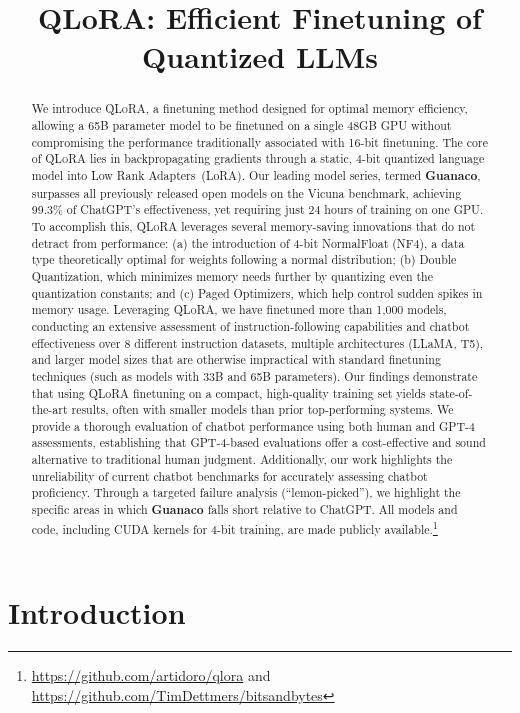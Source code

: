 \title{QLoRA: Efficient Finetuning of Quantized LLMs}

\begin{abstract}
We introduce \textsc{QLoRA}, a finetuning method designed for optimal memory efficiency, allowing a 65B parameter model to be finetuned on a single 48GB GPU without compromising the performance traditionally associated with 16-bit finetuning. The core of \textsc{QLoRA} lies in backpropagating gradients through a static, 4-bit quantized language model into Low Rank Adapters~(LoRA). Our leading model series, termed \textbf{Guanaco}, surpasses all previously released open models on the Vicuna benchmark, achieving 99.3\% of ChatGPT's effectiveness, yet requiring just 24 hours of training on one GPU. To accomplish this, \textsc{QLoRA} leverages several memory-saving innovations that do not detract from performance: (a) the introduction of 4-bit NormalFloat (NF4), a data type theoretically optimal for weights following a normal distribution; (b) Double Quantization, which minimizes memory needs further by quantizing even the quantization constants; and (c) Paged Optimizers, which help control sudden spikes in memory usage. Leveraging \textsc{QLoRA}, we have finetuned more than 1,000 models, conducting an extensive assessment of instruction-following capabilities and chatbot effectiveness over 8 different instruction datasets, multiple architectures (LLaMA, T5), and larger model sizes that are otherwise impractical with standard finetuning techniques (such as models with 33B and 65B parameters). Our findings demonstrate that using QLoRA finetuning on a compact, high-quality training set yields state-of-the-art results, often with smaller models than prior top-performing systems. We provide a thorough evaluation of chatbot performance using both human and GPT-4 assessments, establishing that GPT-4-based evaluations offer a cost-effective and sound alternative to traditional human judgment. Additionally, our work highlights the unreliability of current chatbot benchmarks for accurately assessing chatbot proficiency. Through a targeted failure analysis (“lemon-picked”), we highlight the specific areas in which \textbf{Guanaco} falls short relative to ChatGPT. All models and code, including CUDA kernels for 4-bit training, are made publicly available.\footnote{\url{https://github.com/artidoro/qlora} and \url{https://github.com/TimDettmers/bitsandbytes}}
\end{abstract}

\section{Introduction}


